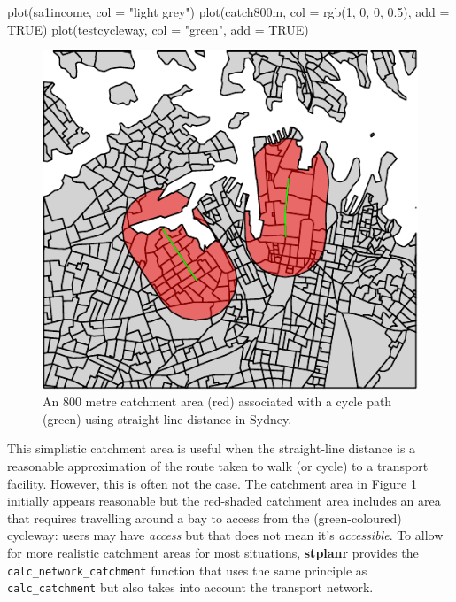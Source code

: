 \begin{Schunk}
\begin{Sinput}
plot(sa1income, col = "light grey")
plot(catch800m, col = rgb(1, 0, 0, 0.5), add = TRUE)
plot(testcycleway, col = "green", add = TRUE)
\end{Sinput}
\begin{figure}
\includegraphics[center]{catchmentplot-1} \caption[An 800 metre catchment area (red) associated with a cycle path (green) using straight-line distance in Sydney]{An 800 metre catchment area (red) associated with a cycle path (green) using straight-line distance in Sydney.}\label{fig:catchmentplot}
\end{figure}
\end{Schunk}

This simplistic catchment area is useful when the straight-line distance
is a reasonable approximation of the route taken to walk (or cycle) to a
transport facility. However, this is often not the case. The catchment
area in Figure \ref{fig:catchmentplot} initially appears reasonable but
the red-shaded catchment area includes an area that requires travelling
around a bay to access from the (green-coloured) cycleway:
users may have \emph{access} but that does not mean it's \emph{accessible}. To allow for
more realistic catchment areas for most situations, \textbf{stplanr}
provides the \texttt{calc\_network\_catchment} function that uses the
same principle as \texttt{calc\_catchment} but also takes into account
the transport network.

